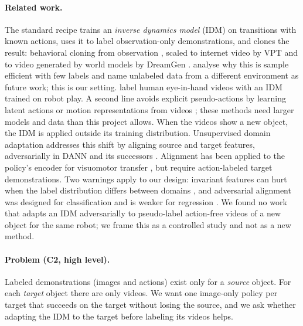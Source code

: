 \documentclass{article}
\begin{document}
\paragraph{Related work.}
The standard recipe trains an \emph{inverse dynamics model} (IDM) on transitions with
known actions, uses it to label observation-only demonstrations, and clones the result:
behavioral cloning from observation \citep{torabi2018bco}, scaled to internet video by
VPT \citep{baker2022vpt} and to video generated by world models by DreamGen
\citep{jang2025dreamgen}. \citet{morin2026idmssil} analyse why this is sample efficient
with few labels and name unlabeled data from a different environment as future work;
this is our setting. \citet{kim2023givinghand} label human eye-in-hand videos with an
IDM trained on robot play. A second line avoids explicit pseudo-actions by learning
latent actions or motion representations from videos
\citep{ye2025lapa,collins2025amplify,nikulin2025laom}; these methods need larger models
and data than this project allows. When the videos show a new object, the IDM is applied
outside its training distribution. Unsupervised domain adaptation addresses this
shift by aligning source and target features, adversarially in DANN
\citep{ganin2016dann} and its successors \citep{tzeng2017adda,long2018cdan}. Alignment
has been applied to the policy's encoder for visuomotor transfer
\citep{cheng2025gda,kato2026udail}, but \citet{cheng2025gda} require action-labeled
target demonstrations. Two warnings apply to our design: invariant features can hurt
when the label distribution differs between domains \citep{zhao2019invariant}, and
adversarial alignment was designed for classification and is weaker for regression
\citep{nejjar2023daregram}. We found no work that adapts an IDM adversarially to
pseudo-label action-free videos of a new object for the same robot; we frame this as a
controlled study and not as a new method.

\paragraph{Problem (C2, high level).}
Labeled demonstrations (images and actions) exist only for a \emph{source} object.
For each \emph{target} object there are only videos. We want one image-only policy per
target that succeeds on the target without losing the source, and we ask whether
adapting the IDM to the target before labeling its videos helps.
\end{document}
